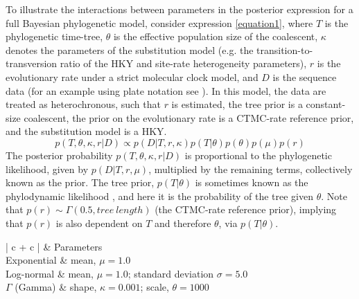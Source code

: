 \documentclass[10pt,letterpaper]{article}
\newlength\savedwidth
\newcommand\thickhline{\noalign{\global\savedwidth\arrayrulewidth\global\arrayrulewidth 2pt}%
\hline
\noalign{\global\arrayrulewidth\savedwidth}}
\begin{document}
{To illustrate the interactions between parameters in the posterior expression for a full Bayesian phylogenetic model, consider expression \ref{equation1}, where $T$ is the phylogenetic time-tree, $\theta$ is the effective population size of the coalescent, $\kappa$ denotes the parameters of the substitution model (e.g. the transition-to-transversion ratio of the HKY and site-rate heterogeneity parameters), $r$ is the evolutionary rate under a strict molecular clock model, and $D$ is the sequence data (for an example using plate notation see \cite{hohna2014probabilistic}). In this model, the data are treated as heterochronous, such that $r$ is estimated, the tree prior is a constant-size coalescent, the prior on the evolutionary rate is a CTMC-rate reference prior, and the substitution model is a HKY.
\begin{equation}
\label{equation1}
p(T, \theta, \kappa, r|D) \propto p(D|T, r, \kappa) p(T|\theta) p(\theta) p(\mu) p(r)
\end{equation}
The posterior probability $p(T, \theta, \kappa, r|D)$ is proportional to the phylogenetic likelihood, given by $p(D|T, r, \mu)$, multiplied by the remaining terms, collectively known as the prior. The tree prior, $p(T|\theta)$ is sometimes known as the phylodynamic likelihood \cite{du2015getting}, and here it is the probability of the tree given $\theta$. Note that $p(r)\sim\Gamma(0.5, tree\ length)$ (the CTMC-rate reference prior), implying that $p(r)$ is also dependent on $T$ and therefore $\theta$, via $p(T|\theta)$.}

\begin{table}[h]
\caption{Prior distributions for the effective population size of the constant-size coalescent (known as $\theta$ in the constant-size coalescent and different to the scale parameter of the $\Gamma$ distribution).}
\begin{center} 
	\label{table:prior_distros_on_Phi}
	\begin{tabular}{| c + c |}
    \hline
		 & Parameters\\ \thickhline
		Exponential & mean, $\mu=1.0$\\ \hline
		Log-normal & mean, $\mu=1.0$; standard deviation $\sigma=5.0$\\ \hline
		$\Gamma$ (Gamma) & shape, $\kappa=0.001$; scale, $\theta=1000$\\ \hline
	\end{tabular}
\end{center}
\end{table}
\end{document}
